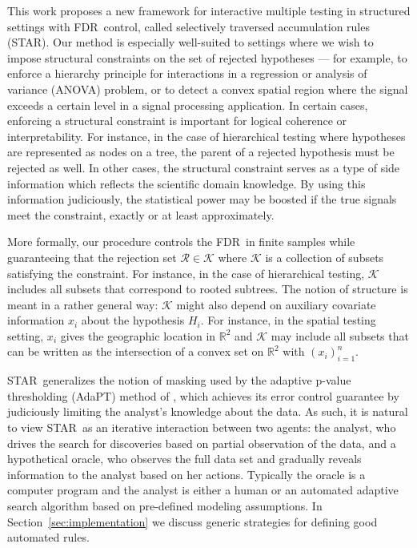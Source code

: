 \documentclass{biometrika}
\newcommand{\cR}{\mathcal{R}}
\newcommand{\cK}{\mathcal{K}}
\newcommand{\ANOVA}{ANOVA}
\newcommand{\textFDR}{FDR}
\newcommand{\Star}{STAR}
\renewcommand{\star}{STAR}
\newcommand{\adapt}{AdaPT}
\newcommand{\R}{\mathbb{R}}
\newcommand{\1}{\mathbf{1}}
\begin{document}
This work proposes a new framework for interactive multiple testing in structured settings with \textFDR ~control, called selectively traversed accumulation rules (\star). Our method is especially well-suited to settings where we wish to impose structural constraints on the set of rejected hypotheses --- for example, to enforce a hierarchy principle for interactions in a regression or analysis of variance (\ANOVA) problem, or to detect a convex spatial region where the signal exceeds a certain level in a signal processing application. In certain cases, enforcing a structural constraint is important for logical coherence or interpretability. For instance, in the case of hierarchical testing  \citep[e.g.][]{yekutieli08} where hypotheses are represented as nodes on a tree, the parent of a rejected hypothesis must be rejected as well. In other cases, the structural constraint serves as a type of side information which reflects the scientific domain knowledge. By using this information judiciously, the statistical power may be boosted if the true signals meet the constraint, exactly or at least approximately.

More formally, our procedure controls the \textFDR ~in finite samples while guaranteeing that the rejection set $\cR\in \cK$ where $\cK$ is a collection of subsets satisfying the constraint. For instance, in the case of hierarchical testing, $\cK$ includes all subsets that correspond to rooted subtrees. The notion of structure is meant in a rather general way: $\cK$ might also depend on auxiliary covariate information $x_i$ about the hypothesis $H_i$. For instance, in the spatial testing setting, $x_i$ gives the geographic location in $\R^{2}$ and $\cK$ may include all subsets that can be written as the intersection of a convex set on $\R^{2}$ with $(x_i)_{i=1}^{n}$. 

\Star ~generalizes the notion of masking used by the adaptive p-value thresholding (\adapt) method of \citet{lei2018adapt}, which achieves its error control guarantee by judiciously limiting the analyst's knowledge about the data. As such, it is natural to view \star ~as an iterative interaction between two agents: the analyst, who drives the search for discoveries based on partial observation of the data, and a hypothetical oracle, who observes the full data set and gradually reveals information to the analyst based on her actions. Typically the oracle is a computer program and the analyst is either a human or an automated adaptive search algorithm based on pre-defined modeling assumptions. In Section~\ref{sec:implementation} we discuss generic strategies for defining good automated rules. 
\end{document}
